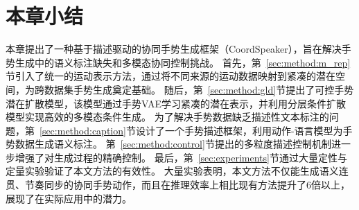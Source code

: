 \section{本章小结}
本章提出了一种基于描述驱动的协同手势生成框架（CoordSpeaker），旨在解决手势生成中的语义标注缺失和多模态协同控制挑战。
首先，第~\ref{sec:method:m_rep}节引入了统一的运动表示方法，通过将不同来源的运动数据映射到紧凑的潜在空间，为跨数据集手势生成奠定基础。
随后，第~\ref{sec:method:gld}节提出了可控手势潜在扩散模型，该模型通过手势VAE学习紧凑的潜在表示，并利用分层条件扩散模型实现高效的多模态条件生成。
为了解决手势数据缺乏描述性文本标注的问题，第~\ref{sec:method:caption}节设计了一个手势描述框架，利用动作-语言模型为手势数据生成语义标注。
第~\ref{sec:method:control}节提出的多粒度描述控制机制进一步增强了对生成过程的精确控制。
最后，第~\ref{sec:experiments}节通过大量定性与定量实验验证了本文方法的有效性。
大量实验表明，本文方法不仅能生成语义连贯、节奏同步的协同手势动作，而且在推理效率上相比现有方法提升了6倍以上，展现了在实际应用中的潜力。
